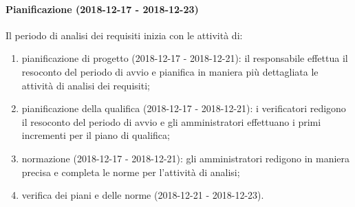 		\paragraph{Pianificazione (2018-12-17 - 2018-12-23)\\} Il periodo di analisi dei requisiti inizia con le attività di:
			\begin{enumerate}[label = 2.1.\arabic*)]
				\item pianificazione di progetto (2018-12-17 - 2018-12-21): il responsabile effettua il resoconto del periodo di avvio e pianifica in maniera più dettagliata le attività di analisi dei requisiti; 
				\item pianificazione della qualifica (2018-12-17 - 2018-12-21): i verificatori redigono il resoconto del periodo di avvio e gli amministratori effettuano i primi incrementi per il piano di qualifica;
				\item normazione (2018-12-17 - 2018-12-21): gli amministratori redigono in maniera precisa e completa le norme per l'attività di analisi;
				\item verifica dei piani e delle norme (2018-12-21 - 2018-12-23).
			\end{enumerate}

